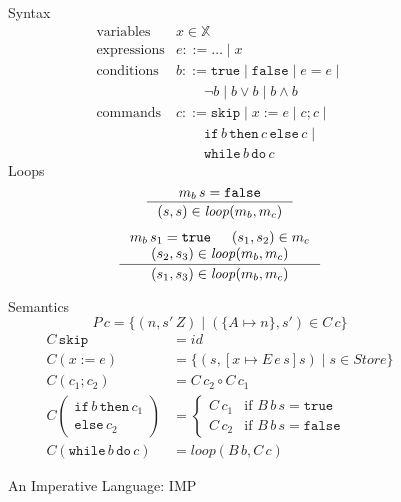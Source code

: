 \documentclass{tufte-handout}
\newcommand{\ASSIGN}[2]{#1 \mathrel{:=} #2}
\newcommand{\SEQ}[2]{#1 \mathrel{;} #2}
\newcommand{\SKIP}[0]{\mathtt{skip}}
\newcommand{\IF}[3]{\mathtt{if}\,#1\,\mathtt{then}\,#2\,\mathtt{else}\,#3}
\newcommand{\WHILE}[2]{\mathtt{while}\,#1\,\mathtt{do}\,#2}
\newcommand{\TRUE}[0]{\mathtt{true}}
\newcommand{\FALSE}[0]{\mathtt{false}}
\begin{document}
\begin{figure*}
\begin{minipage}{0.5\textwidth}
\noindent Syntax
\[
\begin{array}{ll}
  \text{variables} & x \in \mathbb{X}  \\
 \text{expressions} & e ::= \ldots \mid x \\
 \text{conditions} & b  ::= \TRUE \mid \FALSE \mid e = e \mid \\
  &   \qquad \neg b \mid b \lor b \mid b \land b \\
 \text{commands}& c ::= \SKIP \mid \ASSIGN{x}{e} \mid \SEQ{c}{c} \mid\\
  &      \qquad \IF{b}{c}{c} \mid \\
  &      \qquad \WHILE{b}{c} 
\end{array}
\]
Loops
\begin{gather*}
  \inference{m_b\,s = \FALSE}
            {(s,s) \in \mathit{loop}(m_b, m_c)}
\\[1ex]
  \inference{m_b\,s_1 = \TRUE & 
             (s_1,s_2) \in m_c \\
             (s_2, s_3) \in \mathit{loop}(m_b, m_c)}
            {(s_1, s_3) \in \mathit{loop}(m_b, m_c)}
\end{gather*}
\end{minipage}
\begin{minipage}{0.5\textwidth}
Semantics 
\[
P\,c = \{ (n,s'\,Z) \mid (\{A{\mapsto} n\},s') \in C\,c \}
\]
\begin{align*}
C\,\SKIP &= \mathit{id} \\ %
C(\ASSIGN{x}{e}) &= \{ (s,[x\mapsto E\,e\,s]s) \mid s {\in} \mathit{Store} \}\\
C(\SEQ{c_1}{c_2}) &=  C\,c_2 \circ C\,c_1 \\
C\left(\!\!\begin{array}{l}
  \mathtt{if}\,b\,\mathtt{then}\,c_1\\
  \mathtt{else}\,c_2
  \end{array}\!\!\right)
  &= 
 \begin{cases}
  C\,c_1 & \text{if } B\,b\,s = \TRUE \\
  C\,c_2 & \text{if } B\,b\,s = \FALSE
 \end{cases} \\
C(\WHILE{b}{c}) &= \mathit{loop}(B\,b, C\,c)
\end{align*}
\end{minipage}
\caption{An Imperative Language: IMP}
\label{fig:imperative}
\end{figure*}
\end{document}
